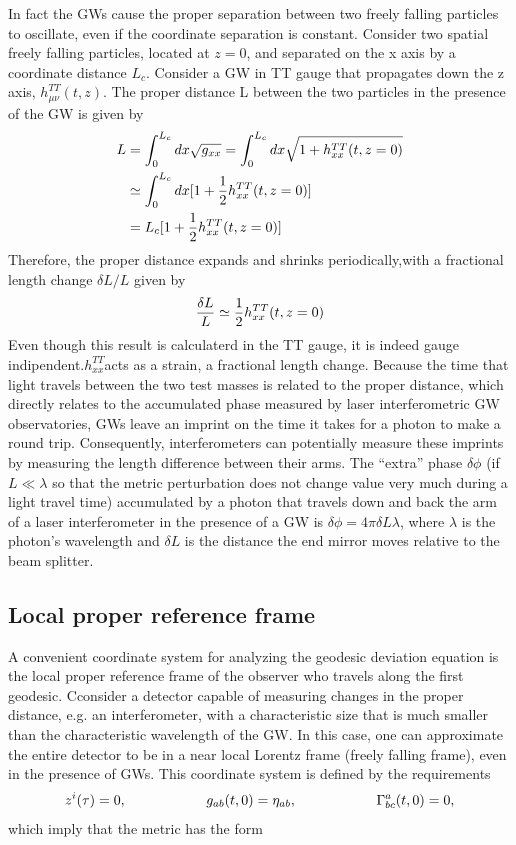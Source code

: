 \documentclass[binding=0.6cm, LaM]{sapthesis}
\begin{document}
In fact the GWs cause the
proper separation between two freely falling particles to oscillate, even if the coordinate
separation is constant. Consider two spatial freely falling particles, located at $z = 0$, and separated on the x axis by a coordinate distance $L_c$. Consider a GW in TT gauge that propagates down the z axis, $h^{TT}_{\mu\nu}(t,z)$. The proper distance L between the two particles in the presence of the GW is given by
\begin{align}
L & = \int^{L_c}_{0}{dx\sqrt{g_{xx}}} = \int^{L_c}_{0}dx\sqrt{1 + h^{TT}_{xx}(t,z=0)} \\
 & \simeq \int^{L_c}_{0}{dx[1 + {1 \over 2}h^{TT}_{xx}(t,z=0)]} \\
&= L_c[1 + {1 \over 2}h^{TT}_{xx}(t,z=0)]
\end{align}
Therefore, the proper distance expands and shrinks periodically,with a fractional length change $\delta L/L$ given by
\begin{equation}
{{\delta L}\over{L}} \simeq {1 \over 2} h_{xx}^{TT}(t,z=0)
\end{equation}
Even though this result is calculaterd in the TT gauge, it is indeed gauge indipendent.$h_{xx}^{TT}$acts as a strain, a fractional length change.
 Because the time that light travels between the two test masses is related to the proper distance,  which directly relates to the accumulated phase measured by laser interferometric GW observatories,
 GWs leave an imprint on the time it takes for a photon to make a round trip. Consequently, interferometers can potentially measure these imprints by measuring the length difference between 
their arms. The “extra” phase $\delta \phi$ (if $L \ll \lambda$ so that the metric perturbation does not change value very much during a light travel time) accumulated by a photon that travels 
down and back the arm of a laser interferometer in the presence of a GW is $\delta \phi = 4\pi \delta L \lambda$, where $\lambda$ is the photon’s wavelength and $\delta L$ is the distance 
the end mirror moves relative to the beam splitter. 




\subsection{Local proper reference frame}

A convenient coordinate system for analyzing the geodesic deviation equation is the local proper reference frame of the observer who travels along the first geodesic. 
Cconsider a detector capable of measuring changes in the proper distance, e.g. an interferometer, with a characteristic size that is much smaller than the characteristic wavelength of the GW. 
In this case, one can approximate the entire detector to be in a near local Lorentz frame  (freely falling frame), even in the presence of GWs. This coordinate system is defined by the requirements
\begin{equation}
z^i(\tau) = 0, \hspace*{2cm} g_{ab}(t, 0) = \eta_{ab}, \hspace*{2cm} \Gamma^a_{bc}(t,0) = 0,
\end{equation}
which imply that the metric has the form
\end{document}
